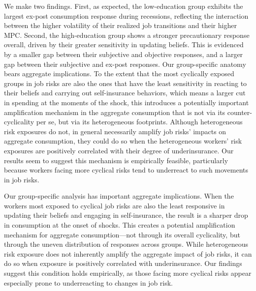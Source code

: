 We make two findings. First, as expected, the low-education group exhibits the largest ex-post consumption response during recessions, reflecting the interaction between the higher volatility of their realized job transitions and their higher MPC. Second, the high-education group shows a stronger precautionary response overall, driven by their greater sensitivity in updating beliefs. This is evidenced by a smaller gap between their subjective and objective responses, and a larger gap between their subjective and ex-post responses.
Our group-specific anatomy bears aggregate implications. To the extent that the most cyclically exposed groups in job risks are also the ones that have the least sensitivity in reacting to their beliefs and carrying out self-insurance behaviors, which means a larger cut in spending at the moments of the shock, this introduces a potentially important amplification mechanism in the aggregate consumption that is not via its counter-cyclicality per se, but via its heterogeneous footprints. Although heterogeneous risk exposures do not, in general necessarily amplify job risks' impacts on aggregate consumption, they could do so when the heterogeneous workers' risk exposures are positively correlated with their degree of underinsurance. Our results seem to suggest this mechanism is empirically feasible, particularly because workers facing more cyclical risks tend to underreact to such movements in job risks. 

Our group-specific analysis has important aggregate implications. When the workers most exposed to cyclical job risks are also the least responsive in updating their beliefs and engaging in self-insurance, the result is a sharper drop in consumption at the onset of shocks. This creates a potential amplification mechanism for aggregate consumption—not through its overall cyclicality, but through the uneven distribution of responses across groups. While heterogeneous risk exposure does not inherently amplify the aggregate impact of job risks, it can do so when exposure is positively correlated with underinsurance. Our findings suggest this condition holds empirically, as those facing more cyclical risks appear especially prone to underreacting to changes in job risk.


